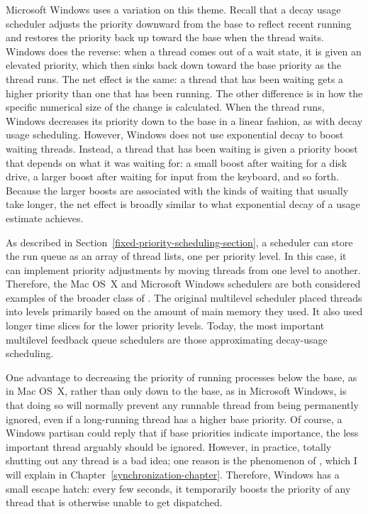 Microsoft Windows uses a variation on this theme.  Recall that a decay
usage scheduler adjusts the priority downward from the base to reflect
recent running and restores the priority back up toward the base
when the thread waits.  Windows does the reverse: when a thread comes
out of a wait state, it is given an elevated priority, which then
sinks back down toward the base priority as the thread runs.  The net
effect is the same: a thread that has been waiting gets a higher
priority than one that has been running.  The other difference is in
how the specific numerical size of the change is calculated.  When the
thread runs, Windows decreases its priority down to the base in a
linear fashion, as with decay usage scheduling.  However, Windows does
not use exponential decay to boost waiting threads.  Instead, a thread
that has been waiting is given a priority boost that depends on what
it was waiting for: a small boost after waiting for a disk drive, a
larger boost after waiting for input from the keyboard, and so forth.  Because
the larger boosts are associated with the kinds of waiting that
usually take longer, the net effect is broadly similar to what
exponential decay of a usage estimate achieves.

As described in Section~\ref{fixed-priority-scheduling-section}, a
scheduler can store the run queue as an array of thread lists, one per
priority level.  In this case, it can implement priority adjustments
by moving threads from one level to another.  Therefore, the Mac OS~X
and Microsoft Windows schedulers are both considered examples of the
broader class of .  The
original multilevel scheduler placed threads into levels primarily
based on the amount of main memory they used.  It also used longer
time slices for the lower priority levels.  Today, the most important
multilevel feedback queue schedulers are those approximating
decay-usage scheduling.

One advantage to decreasing the priority of running processes below
the base, as in Mac OS~X, rather than only down to the base, as in
Microsoft Windows, is that doing so will normally prevent any runnable
thread from being permanently ignored, even if a long-running thread
has a higher base priority.  Of course, a Windows partisan could reply
that if base priorities indicate importance, the less important thread
arguably should be ignored.  However, in practice, totally shutting
out any thread is a bad idea; one reason is the phenomenon of
, which I will explain in Chapter~\ref{synchronization-chapter}.
Therefore, Windows has a small escape hatch: every few seconds, it
temporarily boosts the priority of any thread that is otherwise unable
to get dispatched.

